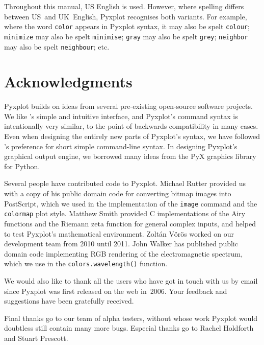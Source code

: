 Throughout this manual, US English is used. However, where spelling differs
between US~and UK~English, Pyxplot recognises both variants. For example, where
the word \texttt{color} appears in Pyxplot syntax, it may also be spelt
\texttt{colour}; \texttt{minimize} may also be spelt \texttt{minimise};
\texttt{gray} may also be spelt \texttt{grey}; \texttt{neighbor} may also be
spelt \texttt{neighbour}; etc.

\section{Acknowledgments}

Pyxplot builds on ideas from several pre-existing open-source software
projects. We like \gnuplot's simple and intuitive interface, and Pyxplot's
command syntax is intentionally very similar, to the point of backwards
compatibility in many cases. Even when designing the entirely new parts of
Pyxplot's syntax, we have followed \gnuplot's preference for short simple
command-line syntax. In designing Pyxplot's graphical output engine, we
borrowed many ideas from the PyX graphics library for Python.

Several people have contributed code to Pyxplot. Michael Rutter provided us 
with a copy of his public domain code for converting bitmap images into
PostScript, which we used in the implementation of the {\tt image} command and
the {\tt colormap} plot style. Matthew Smith provided C implementations of the
Airy functions and the Riemann zeta function for general complex inputs, and
helped to test Pyxplot's mathematical environment. Zolt\'an V\"or\"os worked on
our development team from 2010 until 2011.  John Walker has published public
domain code implementing RGB rendering of the electromagnetic spectrum, which
we use in the {\tt colors.\-wave\-length()} function.

We would also like to thank all the users who have got in touch with us by
email since Pyxplot was first released on the web in~2006. Your feedback and
suggestions have been gratefully received.

Final thanks go to our team of alpha testers, without whose work Pyxplot would
doubtless still contain many more bugs.  Especial thanks go to Rachel Holdforth
and Stuart Prescott.

